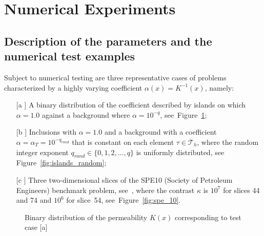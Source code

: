 \documentclass[11pt]{amsart}
\numberwithin{equation}{section}
\theoremstyle{definition}\newtheorem{example}{Example}[section]
\begin{document}
\section{Numerical Experiments}\label{sec:numerics}

\subsection{Description of the parameters and the numerical test examples}

Subject to numerical testing are three representative cases of problems characterized by a highly 
varying coefficient ${{\alpha}}(x) = K^{-1}(x)$, namely:
\begin{enumerate}
\item[[a\hspace{-1ex}]] A binary distribution of the coefficient described by islands on which
 ${{\alpha}}=1.0$ against a background where ${{\alpha}}=10^{-q}$, see~Figure~\ref{fig:islands_binary}; 
 \item[[b\hspace{-1ex}]] Inclusions with ${{\alpha}}=1.0$ and a background with a coefficient 
 ${{\alpha}}={{\alpha}}_{T}=10^{-q_{rand}}$ that is constant on each element $\tau \in  {\mathcal T}_h$,
 where the random integer exponent $q_{rand}\in\{0,1,2,\dots,q\}$ is uniformly distributed,
see Figure~\ref{fig:islands_random};
\item[[c\hspace{-1ex}]] Three two-dimensional slices of the SPE10 
(Society of Petroleum Engineers) 
benchmark problem, see~\cite{SPE10_project},
where the contrast $\kappa$ is $10^7$ for slices 44 and 74 and $10^6$ for slice~54,
see~Figure~\ref{fig:spe_10}.
\end{enumerate}

\begin{figure}[hb]
\begin{center}
\hspace{10mm}
\hspace{10mm}
\caption{Binary distribution of the permeability $K(x)$ corresponding to test case [a]}
\label{fig:islands_binary}
 \end{center}
\end{figure}
\end{document}
